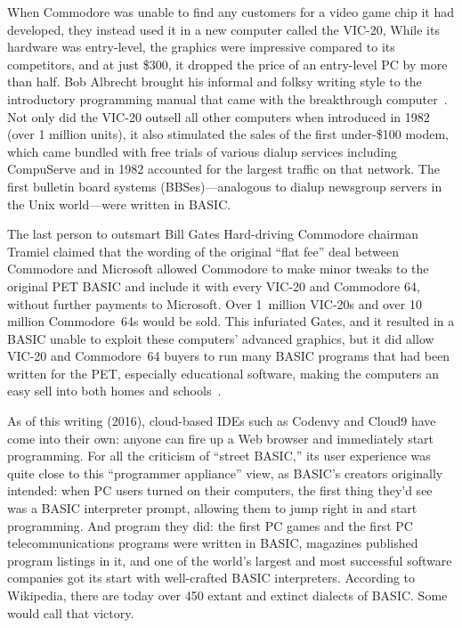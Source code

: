 
When Commodore was unable to find any customers for a video game chip it
had developed, they instead used it in a new computer called the VIC-20,
While its hardware was entry-level, the graphics were impressive
compared to its competitors, and at just \$300, it dropped the price of
an entry-level PC by more than half.
Bob Albrecht brought his informal and folksy writing style to the
introductory programming manual that came with the breakthrough
computer~\cite{commodore}.
Not only did the VIC-20 outsell all other computers when introduced in
1982 (over 1 million units), it also stimulated the sales of the
first under-\$100 modem, which came bundled with free trials of various
dialup services including CompuServe and in 1982 accounted for the
largest traffic on that network.  The first bulletin board systems
(BBSes)---analogous to dialup newsgroup servers in the Unix world---were
written in BASIC.

\begin{tangent}{The last person to outsmart Bill Gates}
Hard-driving Commodore chairman Tramiel claimed that the wording of the
original ``flat fee'' deal between Commodore and Microsoft allowed
Commodore to make minor tweaks to the original PET BASIC and include it
with every VIC-20 and Commodore 64, without further payments to
Microsoft.
Over 1~million VIC-20s and over 10 million Commodore~64s would be sold.
This infuriated Gates, and it resulted in a BASIC unable to exploit
these computers' advanced graphics, but it did allow VIC-20 and
Commodore~64 buyers to run many BASIC programs that had been written
for the PET, especially educational software, making the computers an
easy sell into both homes and schools~\cite[p. 414]{commodore}.

\end{tangent}

As of this writing (2016), cloud-based IDEs such as Codenvy and Cloud9
have come into their own: anyone can fire up a Web browser and
immediately start programming.
For all the criticism of ``street BASIC,'' its user experience was quite
close to this ``programmer appliance'' view, as BASIC's creators
originally intended: when PC users turned on their computers, the first
thing they'd see was a BASIC interpreter prompt, allowing them to jump
right in and start programming.
And program they did: the first PC games and the first PC
telecommunications programs were written in BASIC, magazines published
program listings in it, and one of the world's largest and most
successful software companies got its start with well-crafted BASIC
interpreters.
According to Wikipedia, there are today over 450 extant and extinct
dialects of BASIC.
Some would call that victory.
